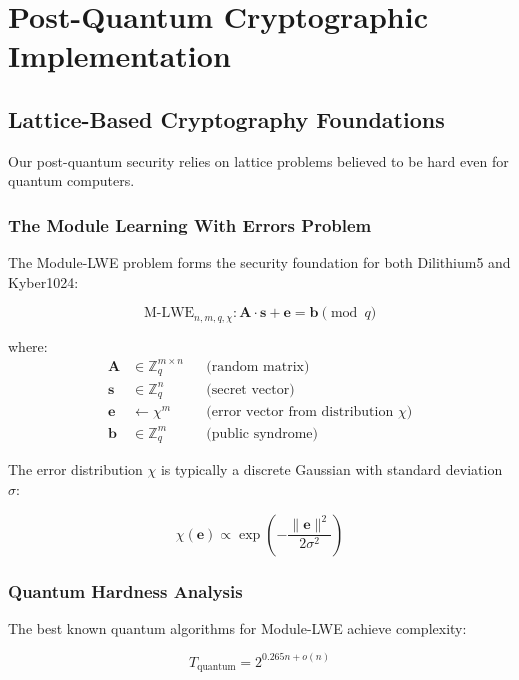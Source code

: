 \documentclass[11pt,a4paper]{article}
\begin{document}
\section{Post-Quantum Cryptographic Implementation}

\subsection{Lattice-Based Cryptography Foundations}

Our post-quantum security relies on lattice problems believed to be hard even for quantum computers.

\subsubsection{The Module Learning With Errors Problem}

The Module-LWE problem forms the security foundation for both Dilithium5 and Kyber1024:

\begin{equation}
\text{M-LWE}_{n,m,q,\chi}: \mathbf{A} \cdot \mathbf{s} + \mathbf{e} = \mathbf{b} \pmod{q}
\label{eq:mlwe}
\end{equation}

where:
\begin{align}
\mathbf{A} &\in \mathbb{Z}_q^{m \times n} &&\text{(random matrix)}\\
\mathbf{s} &\in \mathbb{Z}_q^n &&\text{(secret vector)}\\
\mathbf{e} &\leftarrow \chi^m &&\text{(error vector from distribution } \chi \text{)}\\
\mathbf{b} &\in \mathbb{Z}_q^m &&\text{(public syndrome)}
\end{align}

The error distribution $\chi$ is typically a discrete Gaussian with standard deviation $\sigma$:

\begin{equation}
\chi(\mathbf{e}) \propto \exp\left(-\frac{\|\mathbf{e}\|^2}{2\sigma^2}\right)
\end{equation}

\subsubsection{Quantum Hardness Analysis}

The best known quantum algorithms for Module-LWE achieve complexity:

\begin{equation}
T_{\text{quantum}} = 2^{0.265n + o(n)}
\label{eq:quantum-hardness}
\end{equation}
\end{document}
